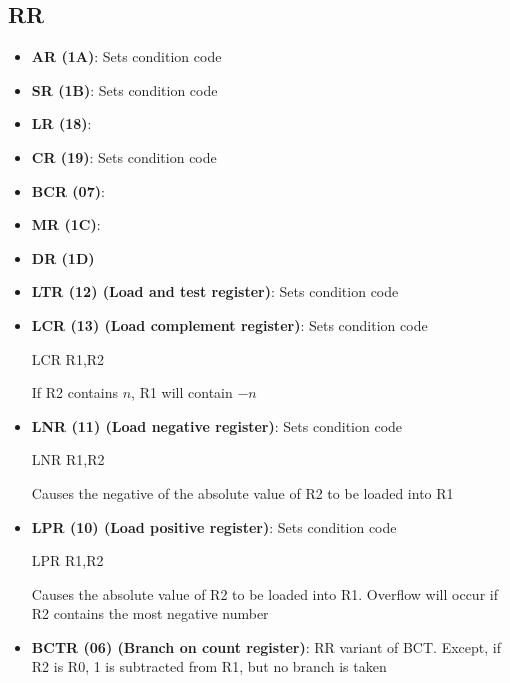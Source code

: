 \documentclass{report}
\begin{document}
    \subsection{RR}
    \begin{itemize}
        \item \textbf{AR (1A)}: Sets condition code
        \item \textbf{SR (1B)}: Sets condition code
        \item \textbf{LR (18)}:
        \item \textbf{CR (19)}: Sets condition code
        \item \textbf{BCR (07)}:
        \item \textbf{MR (1C)}:
        \item \textbf{DR (1D)}
        \item \textbf{LTR (12) (Load and test register)}: Sets condition code
        \item \textbf{LCR (13) (Load complement register)}: Sets condition code
            \bigbreak \noindent 
            \begin{cppcode}
            LCR   R1,R2
            \end{cppcode}
            \bigbreak \noindent 
            If R2 contains $n$, R1 will contain $-n$
        \item \textbf{LNR (11) (Load negative register)}: Sets condition code
            \bigbreak \noindent 
            \begin{cppcode}
            LNR   R1,R2
            \end{cppcode}
            \bigbreak \noindent 
            Causes the negative of the absolute value of R2 to be loaded into R1
        \item \textbf{LPR (10) (Load positive register)}: Sets condition code
            \bigbreak \noindent 
            \begin{cppcode}
            LPR   R1,R2
            \end{cppcode}
            \bigbreak \noindent 
            Causes the absolute value of R2 to be loaded into R1. Overflow will occur if R2 contains the most negative number
        \item \textbf{BCTR (06) (Branch on count register)}: RR variant of BCT. Except, if R2 is R0, 1 is subtracted from R1, but no branch is taken

    \end{itemize}

    \bigbreak \noindent 
\end{document}
